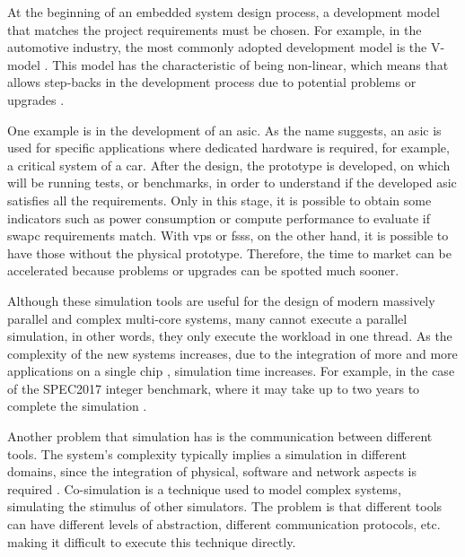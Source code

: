 

At the beginning of an embedded system design process, a development model that matches the project requirements must be chosen. 
For example, in the automotive industry, the most commonly adopted development model is the V-model \cite{liu2016incremental}. This model 
has the characteristic of being non-linear, which means that allows step-backs in the development process due to potential problems or 
upgrades \cite{ProductDesignSteps}. 

One example is in the development of an \gls{asic}. As the name suggests, an \gls{asic} is used for specific 
applications where dedicated hardware is required, for example, a critical system of a car. After the design, the prototype is developed, on 
which will be running tests, or benchmarks, in order to understand if the developed \gls{asic} satisfies all the requirements. Only in this stage, 
it is possible to obtain some indicators such as power consumption or compute performance to evaluate if \gls{swapc} requirements match. 
With \glspl{vp} or \glspl{fss}, on the other hand, it is possible to have those without the physical prototype. 
Therefore, the time to market can be accelerated because problems or upgrades can be spotted much sooner.

Although these simulation tools are useful for the design of modern massively parallel and complex multi-core systems, 
many cannot execute a parallel simulation, in other words, they only execute the workload in one thread. 
As the complexity of the new systems increases, due to the integration of more and more applications on a single chip 
\cite{terascaleComputing}, simulation time increases.
For example, in the case of the SPEC2017 integer benchmark, where it may 
take up to two years to complete the simulation \cite{pargem5}. 

Another problem that simulation has is the communication between different tools. The system's complexity typically implies a simulation in 
different domains, since the integration of physical, software and network aspects is required \cite{gomes2017co}. Co-simulation is a technique 
used to model complex systems, simulating the stimulus of other simulators. The problem is that different tools can have different levels 
of abstraction, different communication protocols, etc. making it difficult to execute this technique directly. 

